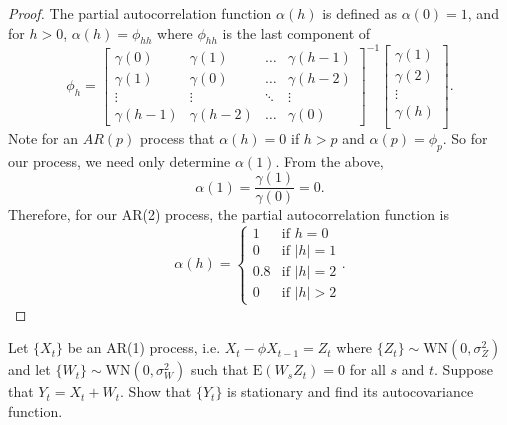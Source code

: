 \documentclass[12pt]{article}
\theoremstyle{definition}
\newenvironment{custompbm}[1]
  {\renewcommand\theproblem{#1}\problem}
  {\endproblem}
\newcommand{\E}{\text{E}}
\begin{document}
\begin{proof}
  The partial autocorrelation function $\alpha(h)$ is defined as $\alpha(0) = 1$,
  and for $h > 0$, $\alpha(h) = \phi_{hh}$ where $\phi_{hh}$ is the last component of
  \[
    \phi_h =
    \begin{bmatrix}
      \gamma(0) & \gamma(1) & \dots & \gamma(h-1) \\
      \gamma(1) & \gamma(0) & \dots & \gamma(h-2) \\
      \vdots & \vdots & \ddots & \vdots \\
      \gamma(h - 1) & \gamma(h-2) & \dots & \gamma(0)
    \end{bmatrix}^{-1}
    \begin{bmatrix}
      \gamma(1) \\
      \gamma(2) \\
      \vdots\\
      \gamma(h) \\
    \end{bmatrix}.
  \]
  Note for an $AR(p)$ process that $\alpha(h) = 0$ if $h > p$ and $\alpha(p) = \phi_p$. So for our process, we need only determine
  $\alpha(1)$. From the above,
  \[
    \alpha(1) = \frac{\gamma(1)}{\gamma(0)} = 0.
  \]
  Therefore, for our AR(2) process, the partial autocorrelation function is
  \[
    \alpha(h) =
    \begin{cases}
      1 & \text{if $h = 0$}\\
      0 & \text{if $|h| = 1$}\\
      0.8 & \text{if $|h| = 2$} \\
      0 & \text{if $|h| > 2$}
    \end{cases}.
  \]
\end{proof}


\begin{custompbm}{3.a}
  Let $\{X_t\}$ be an AR(1) process, i.e. $X_t - \phi X_{t-1} = Z_t$ where $\{Z_t\} \sim \text{WN}(0, \sigma_Z^2)$ and
  let $\{W_t\} \sim \text{WN}(0, \sigma_W^2)$ such that $\E(W_sZ_t) = 0$ for all $s$ and $t$.
  Suppose that $Y_t = X_t + W_t$. Show that $\{Y_t\}$ is stationary and find its autocovariance function.
\end{custompbm}
\end{document}
